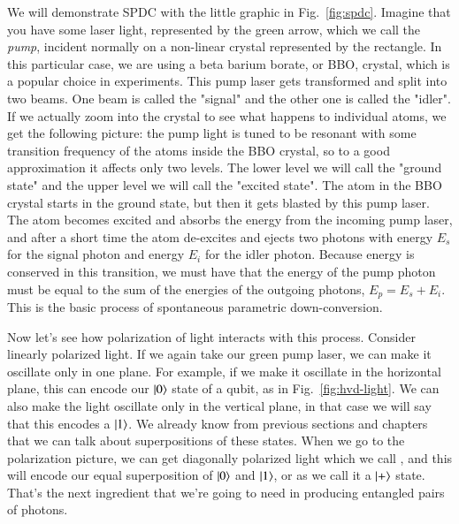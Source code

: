 We will demonstrate SPDC with the little graphic in Fig.~\ref{fig:spdc}. Imagine that you have some laser light, represented by the green arrow, which we call the \emph{pump}, incident normally on a non-linear crystal represented by the rectangle. In this particular case, we are using a beta barium borate, or BBO, crystal, which is a popular choice in experiments. This pump laser gets transformed and split into two beams. One beam is called the "signal" and the other one is called the "idler". If we actually zoom into the crystal to see what happens to individual atoms, we get the following picture: the pump light is tuned to be resonant with some transition frequency of the atoms inside the BBO crystal, so to a good approximation it affects only two levels. The lower level we will call the "ground state" and the upper level we will call the "excited state". The atom in the BBO crystal starts in the ground state, but then it gets blasted by this pump laser.  The atom becomes excited and absorbs the energy from the incoming pump laser, and after a short time the atom de-excites and ejects two photons with energy $E_s$ for the signal photon and energy $E_i$ for the idler photon.     Because energy is conserved in this transition, we must have that the energy of the pump photon must be equal to the sum of the energies of the outgoing photons, $E_p = E_s + E_i$. This is the basic process of spontaneous parametric down-conversion.

Now let's see how polarization of light interacts with this process. Consider linearly polarized light. If we again take our green pump laser, we can make it oscillate only in one plane. For example, if we make it oscillate in the horizontal plane, this can encode our $\left| 0 \right\rangle$ state of a qubit, as in Fig.~\ref{fig:hvd-light}. We can also make the light oscillate only in the vertical plane, in that case we will say that this encodes a $\left| 1 \right\rangle$. We already know from previous sections and chapters that we can talk about superpositions of these states. When we go to the polarization picture, we can get diagonally polarized light which we call , and this will encode our equal superposition of $\left| 0 \right\rangle$ and $\left| 1 \right\rangle$, or as we call it a $\left| + \right\rangle$ state. That's the next ingredient that we're going to need in producing entangled pairs of photons.

